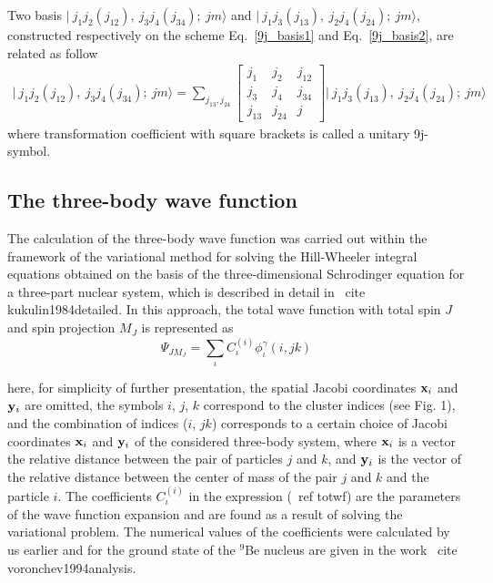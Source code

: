 \documentclass[12pt,a4paper,twoside]{article}
\begin{document}
Two basis  $\vert~ j_1 j_2 (j_{12}),~j_3 j_4 (j_{34});~jm \rangle$ and $\vert~ j_1 j_3 (j_{13}),~j_2 j_4 (j_{24});~jm \rangle $, constructed respectively on the scheme Eq.~\ref{9j_basis1} and Eq.~\ref{9j_basis2},  are related as follow
\begin{align}
\label{9j}
\vert~ j_1 j_2 (j_{12}),~j_3 j_4 (j_{34});~jm \rangle = \sum_{j_{13},j_{24}} 
\begin{bmatrix}
j_1 & j_2 & j_{12} \\ 
j_3 & j_4 & j_{34} \\ 
j_{13} & j_{24} & j
\end{bmatrix} 
\vert~ j_1 j_3 (j_{13}),~j_2 j_4 (j_{24});~jm \rangle 
\end{align}
where transformation coefficient with square brackets is called a unitary 9j-symbol.




  

\subsection*{The three-body wave function}
The calculation of the three-body wave function was carried out within the framework of the variational method for solving the Hill-Wheeler integral equations obtained on the basis of the three-dimensional Schrodinger equation for a three-part nuclear system, which is described in detail in \ cite {kukulin1984detailed}.
In this approach, the total wave function with total spin $ J $ and spin projection $ M_J $ is represented as
 \begin{equation}
 \Psi_{JM_J}= \sum_{\iota} C_{\iota}^{(i)} \phi_{\iota}^{\gamma} \left( i,jk \right)
 \label{totwf}
 \end{equation}

here, for simplicity of further presentation, the spatial Jacobi coordinates $ {\bf x} _i $ and $ {\bf y} _i $ are omitted, the symbols $ i $, $ j $, $ k $ correspond to the cluster indices (see Fig. 1), and the combination of indices ($ i $, $ jk $) corresponds to a certain choice of Jacobi coordinates $ {\bf x} _i $ and $ {\bf y}_i $ of the considered three-body system, where $ {\bf x}_i $ is a vector the relative distance between the pair of particles $ j $ and $ k $, and $ {\bf y}_i $ is the vector of the relative distance between the center of mass of the pair $ j $ and $ k $ and the particle $ i $. 
The coefficients $ C _{\iota}^{(i)} $ in the expression (\ ref {totwf}) are the parameters of the wave function expansion and are found as a result of solving the variational problem. 
The numerical values of the coefficients were calculated by us earlier and for the ground state of the $^9$Be nucleus are given in the work \ cite {voronchev1994analysis}.
\end{document}
